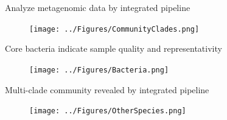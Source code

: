 \documentclass{beamer}
\begin{document}
\begin{frame}{Analyze metagenomic data by integrated pipeline}
    \begin{figure}[H]
       \texttt{[image: ../Figures/CommunityClades.png]}
        \end{figure}
\end{frame}

\begin{frame}{Core bacteria indicate sample quality and representativity}
    \begin{figure}[H]
        \texttt{[image: ../Figures/Bacteria.png]}
    \end{figure}
\end{frame}

\begin{frame}{Multi-clade community revealed by integrated pipeline}
        \begin{figure}
            \centering
            \texttt{[image: ../Figures/OtherSpecies.png]}
        \end{figure}
\end{frame}
\end{document}
